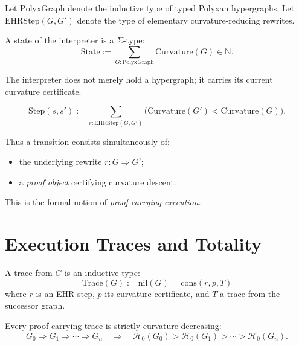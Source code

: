Let $\mathrm{PolyxGraph}$ denote the inductive type of typed Polyxan
hypergraphs.  
Let $\mathrm{EHRStep}(G,G')$ denote the type of elementary curvature-reducing
rewrites.

\begin{definition}
A state of the interpreter is a $\Sigma$-type:
\[
\mathrm{State}
  := \sum_{G:\mathrm{PolyxGraph}}
        \mathrm{Curvature}(G)\in\mathbb{N}.
\]
\end{definition}

The interpreter does not merely hold a hypergraph;
it carries its current curvature certificate.

\begin{definition}
\[
\mathrm{Step}(s,s')
  := \sum_{r:\mathrm{EHRStep}(G,G')}
        \big(\mathrm{Curvature}(G')<\mathrm{Curvature}(G)\big).
\]
\end{definition}

Thus a transition consists simultaneously of:

\begin{itemize}
\item the underlying rewrite $r:G\Rightarrow G'$;
\item a \emph{proof object} certifying curvature descent.
\end{itemize}

This is the formal notion of \emph{proof-carrying execution}.


\section{Execution Traces and Totality}
\label{sec:execution}

\begin{definition}
A trace from $G$ is an inductive type:
\[
\mathrm{Trace}(G)
  := \mathrm{nil}(G)
     \;\mid\;
     \mathrm{cons}(r,p,T)
\]
where $r$ is an EHR step, $p$ its curvature certificate, and $T$ a trace
from the successor graph.
\end{definition}

\begin{lemma}
Every proof-carrying trace is strictly curvature-decreasing:
\[
G_0 \Rightarrow G_1 \Rightarrow \cdots \Rightarrow G_n
\quad\Longrightarrow\quad
\mathcal{H}_0(G_0) > \mathcal{H}_0(G_1) > \cdots > \mathcal{H}_0(G_n).
\]
\end{lemma}

